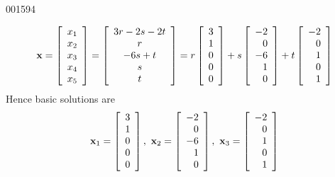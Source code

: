 \begin{example}{}{001594}
\begin{solution}
\begin{equation*}
\textbf{x} = 
\left[ \begin{array}{r}
	x_1 \\
	x_2 \\
	x_3 \\
	x_4 \\
	x_5
\end{array} \right]
=
\left[ \begin{array}{c}
	3r - 2s - 2t \\
	r \\
	-6s + t \\
	s \\
	t
\end{array} \right]
= r
\left[ \begin{array}{r}
	3 \\
	1 \\
	0 \\
	0 \\
	0
\end{array} \right]
+ s
\left[ \begin{array}{r}
	-2 \\
	0 \\
	-6 \\
	1 \\
	0
\end{array} \right]
+ t
\left[ \begin{array}{r}
	-2 \\
	0 \\
	1 \\
	0 \\
	1
\end{array} \right]
\end{equation*}
Hence basic solutions are 
\begin{equation*}
\textbf{x}_1 =
\left[ \begin{array}{r}
	3 \\
	1 \\
	0 \\
	0 \\
	0
\end{array} \right], \
 \textbf{x}_2 =
\left[ \begin{array}{r}
	-2 \\
	0 \\
	-6 \\
	1 \\
	0
\end{array} \right],\
\textbf{x}_3 =
\left[ \begin{array}{r}
	-2 \\
	0 \\
	1 \\
	0 \\
	1
\end{array} \right]
\end{equation*}
\end{solution}
\end{example}

